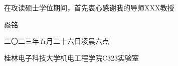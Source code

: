 在攻读硕士学位期间，首先衷心感谢我的导师XXX教授

\vspace{1em}
\begin{flushright}
    焱铭

    二〇二三年\enspace 五月二十六日\enspace 凌晨六点
    
    桂林电子科技大学机电工程学院C323实验室
\end{flushright}